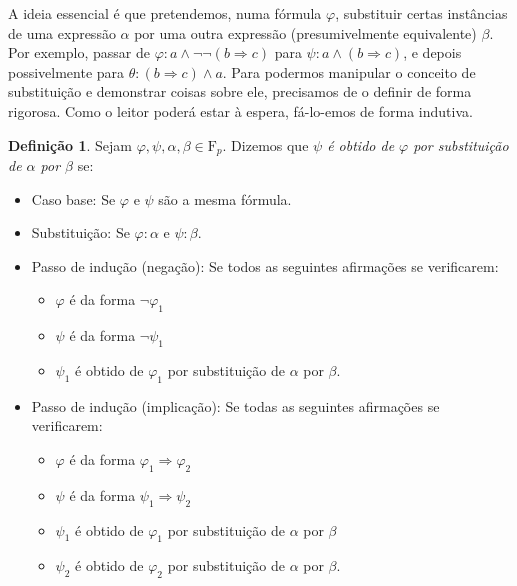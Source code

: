 \documentclass{report}
\theoremstyle{definition}
\newtheorem{definicao}{Definição}
\theoremstyle{remark}
\newcommand{\F}{\mathrm{F}}
\newcommand{\imply}{\mathbin{\Rightarrow}}
\begin{document}
	A ideia essencial é que pretendemos, numa fórmula $\varphi$, substituir certas instâncias de uma expressão $\alpha$ por uma outra expressão (presumivelmente equivalente) $\beta$. Por exemplo, passar de $\varphi : a \land \neg \neg (b \imply c)$ para $\psi : a \land (b \imply c)$, e depois possivelmente para $\theta : (b \imply c) \land a$. Para podermos manipular o conceito de substituição e demonstrar coisas sobre ele, precisamos de o definir de forma rigorosa. Como o leitor poderá estar à espera, fá-lo-emos de forma indutiva.
	
	\begin{definicao}
	Sejam $\varphi, \psi, \alpha, \beta \in \F_p$. Dizemos que \emph{$\psi$ é obtido de $\varphi$ por substituição de $\alpha$ por $\beta$} se:
	
	\begin{itemize}
	\item Caso base: Se $\varphi$ e $\psi$ são a mesma fórmula.
	
	\item Substituição: Se $\varphi : \alpha$ e $\psi : \beta$.
	
	\item Passo de indução (negação): Se todos as seguintes afirmações se verificarem:
	\begin{itemize}
	\item $\varphi$ é da forma $\neg \varphi_1$
	
	\item $\psi$ é da forma $\neg \psi_1$
	
	\item $\psi_1$ é obtido de $\varphi_1$ por substituição de $\alpha$ por $\beta$.
	\end{itemize}
	
	\item Passo de indução (implicação): Se todas as seguintes afirmações se verificarem:
	\begin{itemize}
	\item $\varphi$ é da forma $\varphi_1 \imply \varphi_2$
	
	\item $\psi$ é da forma $\psi_1 \imply \psi_2$
	
	\item $\psi_1$ é obtido de $\varphi_1$ por substituição de $\alpha$ por $\beta$
	
	\item $\psi_2$ é obtido de $\varphi_2$ por substituição de $\alpha$ por $\beta$.
	\end{itemize}
	\end{itemize}
	\end{definicao}
	
\end{document}

